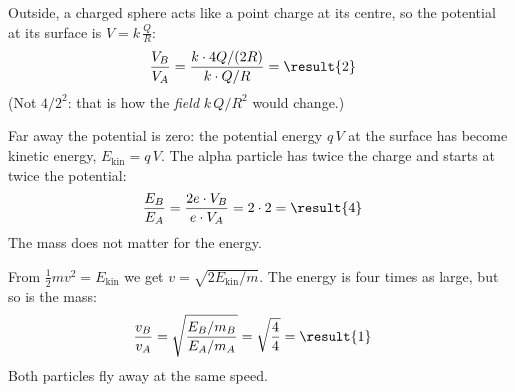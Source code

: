 \begin{abcliste}
\abc Outside, a charged sphere acts like a point charge at its centre, so the potential at its surface is $V = k\,\frac{Q}{R}$:
\begin{align}
 \frac{V_B}{V_A} &= \frac{k\cdot 4Q/(2R)}{k\cdot Q/R} = \result{2}
\end{align}
(Not $4/2^2$: that is how the \emph{field} $k\,Q/R^2$ would change.)

\abc Far away the potential is zero: the potential energy $q\,V$ at the surface has become kinetic energy, $E_\mathrm{kin} = q\,V$. The alpha particle has twice the charge and starts at twice the potential:
\begin{align}
 \frac{E_B}{E_A} &= \frac{2e\cdot V_B}{e\cdot V_A} = 2\cdot 2 = \result{4}
\end{align}
The mass does not matter for the energy.

\abc From $\frac{1}{2} m v^2 = E_\mathrm{kin}$ we get $v = \sqrt{2E_\mathrm{kin}/m}$. The energy is four times as large, but so is the mass:
\begin{align}
 \frac{v_B}{v_A} &= \sqrt{\frac{E_B/m_B}{E_A/m_A}} = \sqrt{\frac{4}{4}} = \result{1}
\end{align}
Both particles fly away at the same speed.
\end{abcliste}
